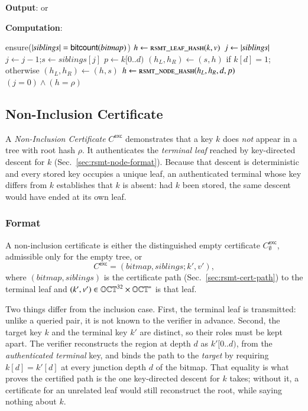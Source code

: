 \textbf{Output}: \TRUE or \FALSE

\textbf{Computation}:
\begin{algorithmic}
		\State ensure($\left|\mathit{siblings}\right|=\mathsf{bitcount}(\mathit{bitmap})$)
		\State $h \gets \Call{rsmt\_leaf\_hash}{k, v}$
		\State $j \gets \left|\mathit{siblings}\right|$
			\State $j \gets j-1$;\quad $s \gets \mathit{siblings}[j]$
			\State $p \gets k[0..d)$ 
			\State $(h_L,h_R)\gets(s,h)$ if $k[d]=1$; otherwise $(h_L,h_R)\gets(h,s)$
			\State $h\gets\Call{rsmt\_node\_hash}{h_L,h_R,d,p}$
		\EndFor
		\State \Return $(j=0)\land(h=\rho)$
	\EndFunction
\end{algorithmic}

\subsection{Non-Inclusion Certificate}\label{sec:rsmt-non-inclusion-cert}

A \emph{Non-Inclusion Certificate} $C^\mathsf{exc}$ demonstrates that a key $k$ does \emph{not} appear in a tree with root hash $\rho$. It authenticates the \emph{terminal leaf} reached by key-directed descent for $k$ (Sec.~\ref{sec:rsmt-node-format}). Because that descent is deterministic and every stored key occupies a unique leaf, an authenticated terminal whose key differs from $k$ establishes that $k$ is absent: had $k$ been stored, the same descent would have ended at its own leaf.

\subsubsection{Format}

A non-inclusion certificate is either the distinguished empty certificate $C^\mathsf{exc}_\emptyset$, admissible only for the empty tree, or
\[
	C^\mathsf{exc}=(\mathit{bitmap},\mathit{siblings};k',v'),
\]
where $(\mathit{bitmap},\mathit{siblings})$ is the certificate path (Sec.~\ref{sec:rsmt-cert-path}) to the terminal leaf and $(k',v')\in\mathbb{OCT}^{32}\times\mathbb{OCT}^{\ast}$ is that leaf.

Two things differ from the inclusion case. First, the terminal leaf is transmitted: unlike a queried pair, it is not known to the verifier in advance. Second, the target key $k$ and the terminal key $k'$ are distinct, so their roles must be kept apart. The verifier reconstructs the region at depth $d$ as $k'[0..d)$, from the \emph{authenticated terminal} key, and binds the path to the \emph{target} by requiring $k[d]=k'[d]$ at every junction depth $d$ of the bitmap. That equality is what proves the certified path is the one key-directed descent for $k$ takes; without it, a certificate for an unrelated leaf would still reconstruct the root, while saying nothing about $k$.

